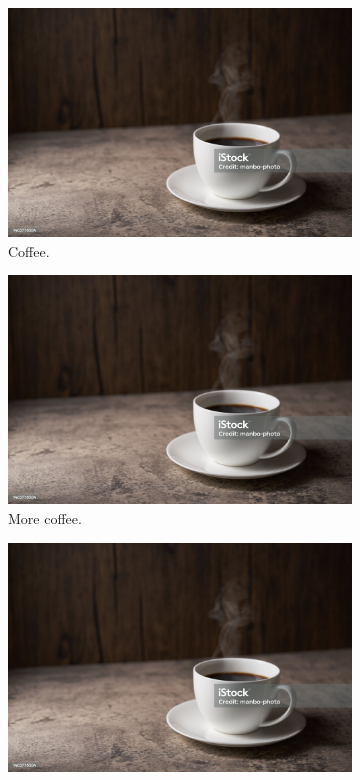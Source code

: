 \documentclass{article}[a4paper,12pt]
\begin{document}
\begin{figure}[h!]
  \centering
  \begin{subfigure}[b]{0.2\linewidth}
    \includegraphics[width=\linewidth]{coffee.jpg}
     \caption{Coffee.}
  \end{subfigure}
  \begin{subfigure}[b]{0.2\linewidth}
    \includegraphics[width=\linewidth]{coffee.jpg}
    \caption{More coffee.}
  \end{subfigure}
  \begin{subfigure}[b]{0.2\linewidth}
    \includegraphics[width=\linewidth]{coffee.jpg}

\end{subfigure}
\end{figure}
\end{document}
